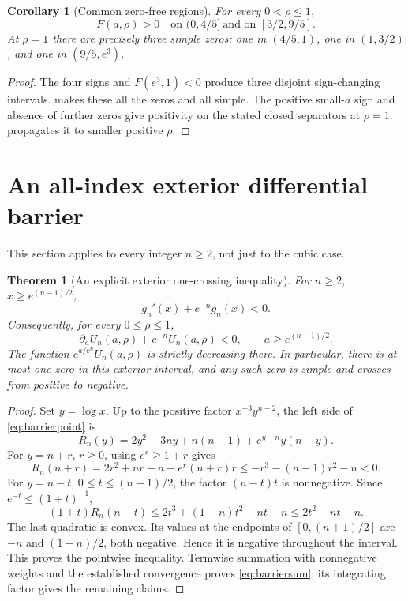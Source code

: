 \documentclass[11pt]{article}
\numberwithin{equation}{section}
\newtheorem{theorem}{Theorem}[section]
\newtheorem{corollary}[corollary]{Corollary}
\theoremstyle{definition}
\begin{document}
\begin{corollary}[Common zero-free regions]\label{cor:separator}
For every $0<\rho\leq1$,
\begin{equation}\label{eq:zerofree}
 F(a,\rho)>0\quad\text{on }(0,4/5]\ \text{and on }[3/2,9/5].
\end{equation}
At $\rho=1$ there are precisely three simple zeros: one in $(4/5,1)$, one
in $(1,3/2)$, and one in $(9/5,e^3)$.
\end{corollary}
\begin{proof}
The four signs and $F(e^3,1)<0$ produce three disjoint sign-changing
intervals.  makes these all the zeros and all simple.
The positive small-$a$ sign and absence of further zeros give positivity on
the stated closed separators at $\rho=1$.  propagates it
to smaller positive $\rho$.
\end{proof}

\section{An all-index exterior differential barrier}
\label{sec:barrier}
This section applies to every integer $n\geq2$, not just to the cubic case.

\begin{theorem}[An explicit exterior one-crossing inequality]\label{thm:barrier}
For $n\geq2$, $x\geq e^{(n-1)/2}$,
\begin{equation}\label{eq:barrierpoint}
 g_n'(x)+e^{-n}g_n(x)<0.
\end{equation}
Consequently, for every $0\leq\rho\leq1$,
\begin{equation}\label{eq:barriersum}
 \partial_a U_n(a,\rho)+e^{-n}U_n(a,\rho)<0,
 \qquad a\geq e^{(n-1)/2}.
\end{equation}
The function $e^{a/e^n}U_n(a,\rho)$ is strictly decreasing there. In
particular, there is at most one zero in this exterior interval, and any
such zero is simple and crosses from positive to negative.
\end{theorem}
\begin{proof}
Set $y=\log x$. Up to the positive factor $x^{-3}y^{n-2}$, the left side of
\eqref{eq:barrierpoint} is
\begin{equation}\label{eq:Rn}
 R_n(y)=2y^2-3ny+n(n-1)+e^{y-n}y(n-y).
\end{equation}
For $y=n+r$, $r\geq0$, using $e^r\geq1+r$ gives
\[
 R_n(n+r)=2r^2+nr-n-e^r(n+r)r
 \leq-r^3-(n-1)r^2-n<0.
\]
For $y=n-t$, $0\leq t\leq(n+1)/2$, the factor $(n-t)t$ is nonnegative.
Since $e^{-t}\leq(1+t)^{-1}$,
\[
 (1+t)R_n(n-t)
 \leq 2t^3+(1-n)t^2-nt-n
 \leq 2t^2-nt-n.
\]
The last quadratic is convex. Its values at the endpoints of
$[0,(n+1)/2]$ are $-n$ and $(1-n)/2$, both negative. Hence it is negative
throughout the interval. This proves the pointwise inequality. Termwise
summation with nonnegative weights and the established convergence proves
\eqref{eq:barriersum}; its integrating factor gives the remaining claims.
\end{proof}
\end{document}
